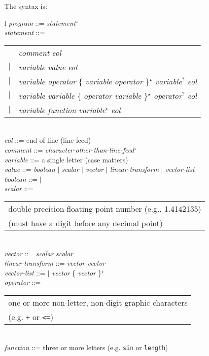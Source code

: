 \documentclass[12pt]{article}
\begin{document}
The syntax is:
\\[1ex]
\hspace*{0.2in}\begin{tabular}{l}
{\em program} ::= {\em statement}$^\star$ \\
{\em statement} ::= \\
\hspace*{0.2in}\begin{tabular}[t]{cl}
                    & {\em comment} {\em eol} \\
                $|$ & {\em variable} \TT{=} {\em value} {\em eol}\\
                $|$ & {\em variable} \TT{=} {\em operator}
		          \{ {\em variable} {\em operator} \}$^\star$
		          {\em variable}$^?$ {\em eol} \\
                $|$ & {\em variable} \TT{=} {\em variable}
		          \{ {\em operator} {\em variable} \}$^\star$
		          {\em operator}$^?$ {\em eol} \\
                $|$ & {\em variable} \TT{=} {\em function}
		          {\em variable}$^\star$ {\em eol} \\
		\end{tabular}
\\[1ex]
{\em eol} ::= end-of-line (line-feed) \\
{\em comment} ::= \TT{\#} {\em character-other-than-line-feed}$^\star$ \\
{\em variable} ::= a single letter (case matters) \\
{\em value} ::= {\em boolean} $|$ {\em scalar} $|$ {\em vector}
	    $|$ {\em linear-transform} $|$ {\em vector-list} \\
{\em boolean} ::=  $|$  \\
{\em scalar} ::= \begin{tabular}[t]{@{}l}
                 double precision floating point number (e.g., 1.4142135) \\
		 (must have a digit before any decimal point) \\
		 \end{tabular} \\
{\em vector} ::= \TT{(} {\em scalar}\TT{,} {\em scalar} \TT{)} \\
{\em linear-transform} ::= \TT{[} {\em vector}\TT{,} {\em vector} \TT{]} \\
{\em vector-list} ::= \TT{()} $|$
                 \TT{(} {\em vector} \{ \TT{,} {\em vector} \}$^\star$ \TT{)} \\
{\em operator} ::= \begin{tabular}[t]{@{}l}
                   one or more non-letter, non-digit graphic characters \\
                   (e.g. {\tt +} or {\tt <=})\\
		   \end{tabular} \\
{\em function} ::= three or more letters (e.g. {\tt sin} or {\tt length})
\end{tabular}
\end{document}
